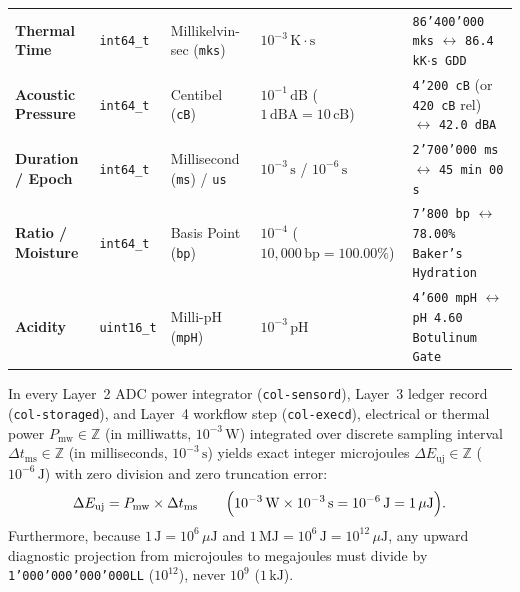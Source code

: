 \begin{table}[htbp]
\begin{tabular}{@{}llllp{4.3cm}@{}}
\textbf{Thermal Time} & \texttt{int64\_t} & Millikelvin-sec (\texttt{mks}) & $10^{-3}\,\mathrm{K\cdot s}$ & \texttt{86'400'000 mks} $\leftrightarrow$ \texttt{86.4 kK$\cdot$s GDD} \\
\textbf{Acoustic Pressure} & \texttt{int64\_t} & Centibel (\texttt{cB}) & $10^{-1}\,\mathrm{dB}$ ($1\,\mathrm{dBA} = 10\,\mathrm{cB}$) & \texttt{4'200 cB} (or \texttt{420 cB} rel) $\leftrightarrow$ \texttt{42.0 dBA} \\
\textbf{Duration / Epoch} & \texttt{int64\_t} & Millisecond (\texttt{ms}) / \texttt{us} & $10^{-3}\,\mathrm{s}$ / $10^{-6}\,\mathrm{s}$ & \texttt{2'700'000 ms} $\leftrightarrow$ \texttt{45 min 00 s} \\
\textbf{Ratio / Moisture} & \texttt{int64\_t} & Basis Point (\texttt{bp}) & $10^{-4}$ ($10{,}000\,\mathrm{bp} = 100.00\%$) & \texttt{7'800 bp} $\leftrightarrow$ \texttt{78.00\% Baker's Hydration} \\
\textbf{Acidity} & \texttt{uint16\_t} & Milli-pH (\texttt{mpH}) & $10^{-3}\,\mathrm{pH}$ & \texttt{4'600 mpH} $\leftrightarrow$ \texttt{pH 4.60 Botulinum Gate} \\
\bottomrule
\end{tabular}
\end{table}

\begin{invariant}
\label{inv:l2-microjoule-identity}
In every Layer~2 ADC power integrator (\texttt{col-sensord}), Layer~3 ledger record (\texttt{col-storaged}), and Layer~4 workflow step (\texttt{col-execd}), electrical or thermal power $P_{\mathrm{mw}} \in \mathbb{Z}$ (in milliwatts, $10^{-3}\,\mathrm{W}$) integrated over discrete sampling interval $\Delta t_{\mathrm{ms}} \in \mathbb{Z}$ (in milliseconds, $10^{-3}\,\mathrm{s}$) yields exact integer microjoules $\Delta E_{\mathrm{uj}} \in \mathbb{Z}$ ($10^{-6}\,\mathrm{J}$) with zero division and zero truncation error:
\begin{equation}
    \Delta E_{\mathrm{uj}} = P_{\mathrm{mw}} \times \Delta t_{\mathrm{ms}} \qquad \Bigl(10^{-3}\,\mathrm{W} \times 10^{-3}\,\mathrm{s} = 10^{-6}\,\mathrm{J} = 1\,\mu\mathrm{J}\Bigr).
    \label{eq:l2-exact-uj}
\end{equation}
Furthermore, because $1\,\mathrm{J} = 10^6\,\mu\mathrm{J}$ and $1\,\mathrm{MJ} = 10^6\,\mathrm{J} = 10^{12}\,\mu\mathrm{J}$, any upward diagnostic projection from microjoules to megajoules must divide by \texttt{1'000'000'000'000LL} ($10^{12}$), never $10^9$ ($1\,\mathrm{kJ}$).
\end{invariant}

